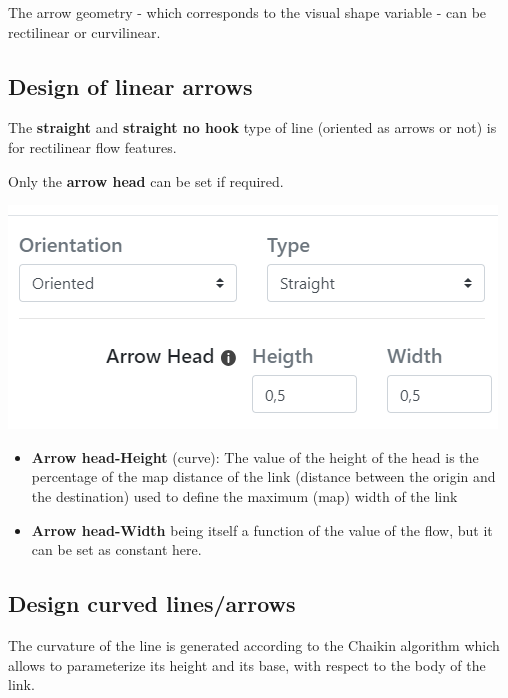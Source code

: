 \documentclass[
  letterpaper,
  DIV=11,
  numbers=noendperiod]{scrreprt}
\begin{document}
The arrow geometry - which corresponds to the visual shape variable -
can be rectilinear or curvilinear.

\subsection{Design of linear arrows}\label{design-of-linear-arrows}

The \textbf{straight} and \textbf{straight no hook} type of line
(oriented as arrows or not) is for rectilinear flow features.

Only the \textbf{arrow head} can be set if required.

\includegraphics{images/geom_add_links_straight.png}

\begin{itemize}
\item
  \textbf{Arrow head-Height} (curve): The value of the height of the
  head is the percentage of the map distance of the link (distance
  between the origin and the destination) used to define the maximum
  (map) width of the link
\item
  \textbf{Arrow head-Width} being itself a function of the value of the
  flow, but it can be set as constant here.
\end{itemize}

\subsection{Design curved lines/arrows}\label{design-curved-linesarrows}

The curvature of the line is generated according to the Chaikin
algorithm which allows to parameterize its height and its base, with
respect to the body of the link.
\end{document}
